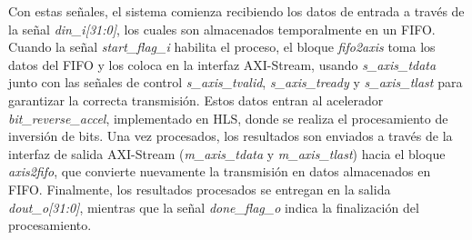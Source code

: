\begin{adjustwidth}{1.5cm}{}
Con estas señales, el sistema comienza recibiendo los datos de entrada a través de la señal \emph{din\_i[31:0]}, los cuales son almacenados temporalmente en un FIFO. 
Cuando la señal \emph{start\_flag\_i} habilita el proceso, el bloque \emph{fifo2axis} toma los datos del FIFO y los coloca en la interfaz AXI-Stream, 
usando \emph{s\_axis\_tdata} junto con las señales de control \emph{s\_axis\_tvalid}, \emph{s\_axis\_tready} y \emph{s\_axis\_tlast} para garantizar la correcta transmisión. 
Estos datos entran al acelerador \emph{bit\_reverse\_accel}, implementado en HLS, donde se realiza el procesamiento de inversión de bits. 
Una vez procesados, los resultados son enviados a través de la interfaz de salida AXI-Stream (\emph{m\_axis\_tdata} y \emph{m\_axis\_tlast}) hacia el bloque \emph{axis2fifo}, 
que convierte nuevamente la transmisión en datos almacenados en FIFO. 
Finalmente, los resultados procesados se entregan en la salida \emph{dout\_o[31:0]}, mientras que la señal \emph{done\_flag\_o} indica la finalización del procesamiento.

\end{adjustwidth}

\vspace{0.4em} %

